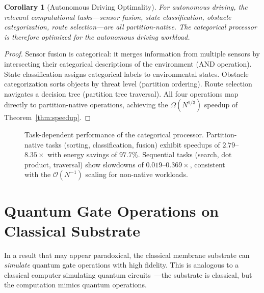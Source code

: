 \documentclass[12pt]{article}
\newtheorem{corollary}[theorem]{Corollary}
\theoremstyle{definition}
\theoremstyle{remark}
\begin{document}
\begin{corollary}[Autonomous Driving Optimality]
\label{cor:driving}
For autonomous driving, the relevant computational tasks---sensor fusion, state classification, obstacle categorization, route selection---are all partition-native. The categorical processor is therefore optimized for the autonomous driving workload.
\end{corollary}

\begin{proof}
Sensor fusion is categorical: it merges information from multiple sensors by intersecting their categorical descriptions of the environment (AND operation). State classification assigns categorical labels to environmental states. Obstacle categorization sorts objects by threat level (partition ordering). Route selection navigates a decision tree (partition tree traversal). All four operations map directly to partition-native operations, achieving the $\Omega(N^{1/3})$ speedup of Theorem~\ref{thm:speedup}. \qedhere
\end{proof}

\begin{figure}[H]
\centering
{}
\caption{Task-dependent performance of the categorical processor. Partition-native tasks (sorting, classification, fusion) exhibit speedups of $2.79$--$8.35\times$ with energy savings of $97.7\%$. Sequential tasks (search, dot product, traversal) show slowdowns of $0.019$--$0.369\times$, consistent with the $\mathcal{O}(N^{-1})$ scaling for non-native workloads.}
\label{fig:benchmark}
\end{figure}


\section{Quantum Gate Operations on Classical Substrate}
\label{sec:quantum_gates}

In a result that may appear paradoxical, the classical membrane substrate can \emph{simulate} quantum gate operations with high fidelity. This is analogous to a classical computer simulating quantum circuits~\citep{feynman1982simulating}---the substrate is classical, but the computation mimics quantum operations.
\end{document}
